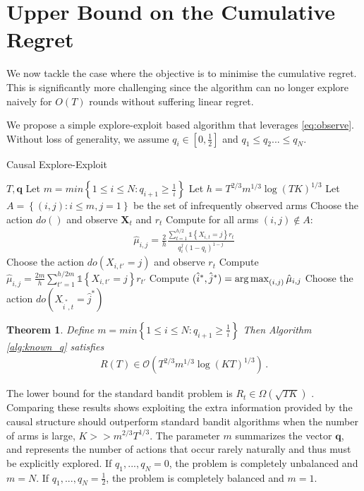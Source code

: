 \documentclass{article}
\newcommand{\set}[1]{\left\{#1\right\}}
\newcommand{\ind}[1]{\mathds{1}\!\!\set{#1}}
\newcommand{\argmax}{\operatornamewithlimits{arg\,max}}
\newcommand{\eq}[1]{\begin{align*}#1\end{align*}}
\newcommand{\bigo}[1]{\mathcal{O}\left( #1 \right)}
\newcommand{\bigomega}[1]{\Omega\left( #1 \right)}
\theoremstyle{plain}
\newtheorem{theorem}{Theorem}
\theoremstyle{definition}
\begin{document}
\section{Upper Bound on the Cumulative Regret}

We now tackle the case where the objective is to minimise the cumulative regret.
This is significantly more challenging since the algorithm can no longer explore naively for $O(T)$ rounds without suffering linear regret.

We propose a simple explore-exploit based algorithm that leverages  \eqref{eq:observe}. Without loss of generality, we assume $q_i \in [0,\frac{1}{2}]$ and $q_1 \leq q_2 ... \leq q_N$. 

\begin{algorithm}[h]
   \caption{Causal Explore-Exploit}
   \label{alg:known_q}
\begin{algorithmic}
    $T,\boldsymbol{q}$
   \STATE Let $m =   min\set{1 \leq i \leq N:q_{i+1} \geq \frac{1}{i}}$
   \STATE Let $h = T^{2/3}m^{1/3} \log(TK)^{1/3}$
   \STATE Let $A = \set{(i,j) : i \leq m, j = 1}$ be the set of infrequently observed arms
   \STATE Choose the action $do()$ and observe $\boldsymbol{X}_t$ and $r_t$
   \ENDFOR
   \STATE Compute for all arms $(i,j) \notin A$:
   \eq{
   \hat{\mu}_{i,j} = \frac{2}{h}\frac{\sum_{t=1}^{h/2}\ind{X_{i,t}=j}r_t}{q_i^j(1-q_i)^{1-j}}
   }
    \STATE Choose the action $do(X_{i,t'} = j)$ and observe $r_t$
    \ENDFOR
    \STATE Compute $\hat{\mu}_{i,j} = \frac{2m}{h}\sum_{t'=1}^{h/2m}\ind{X_{i,t'} = j}r_{t'}$
   \ENDFOR
   \STATE Compute $(\hat{i}^*,\hat{j}^*) = \argmax_{(i,j)} \hat{\mu}_{i,j}$
   \STATE Choose the action $do(X_{\hat{i}^*,t} = \hat{j}^*)$
   \ENDFOR
\end{algorithmic}
\end{algorithm}

\begin{theorem}\label{thm:known_q_regret}
Define $m =   min\set{1 \leq i \leq N:q_{i+1} \geq \frac{1}{i}}$
Then Algorithm \ref{alg:known_q} satisfies
\eq{
R(T) \in \bigo{T^{2/3}m^{1/3} \log(KT)^{1/3}}\,.
}
\end{theorem}

The lower bound for the standard bandit problem is $R_t \in \bigomega{\sqrt{TK}}$ \cite{Auer1995}. Comparing these results shows exploiting the extra information provided by the causal structure should outperform standard bandit algorithms when the number of arms is large, $K >> m^{2/3}T^{1/3}$. The parameter $m$ summarizes the vector $\boldsymbol{q}$, and represents the number of actions that occur rarely naturally and thus must be explicitly explored. If $q_1,...,q_N = 0$, the problem is completely unbalanced and $m = N$. If $q_1,...,q_N = \frac{1}{2}$, the problem is completely balanced and $m = 1$.
\end{document}
